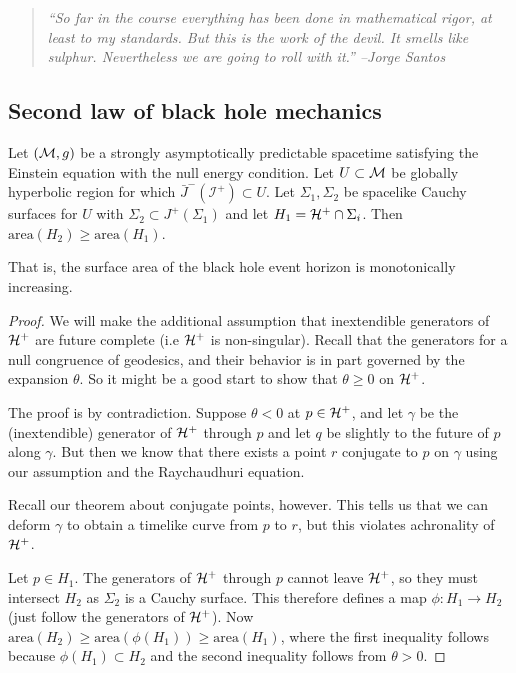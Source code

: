 \begin{quote}
    \textit{``So far in the course everything has been done in mathematical rigor, at least to my standards. But this is the work of the devil. It smells like sulphur. Nevertheless we are going to roll with it.'' --Jorge Santos}
\end{quote}
\subsection*{Second law of black hole mechanics}
\begin{thm}[Hawking 1972]
    Let $(\mathcal{M},g)$ be a strongly asymptotically predictable spacetime satisfying the Einstein equation with the null energy condition. Let $U\subset \mathcal{M}$ be globally hyperbolic region for which $\bar J^-(\mathcal{I}^+)\subset U$.  Let $\Sigma_1,\Sigma_2$ be spacelike Cauchy surfaces for $U$ with $\Sigma_2 \subset J^+(\Sigma_1)$ and let $H_1=\mathcal H^+ \cap \Sigma_i$. Then $\text{area}(H_2) \geq \text{area}(H_1)$.
\end{thm}
That is, the surface area of the black hole event horizon is monotonically increasing.
\begin{proof}
    We will make the additional assumption that inextendible generators of $\mathcal H^+$ are future complete (i.e $\mathcal H^+$ is non-singular). Recall that the generators for a null congruence of geodesics, and their behavior is in part governed by the expansion $\theta$. So it might be a good start to show that $\theta \geq 0$ on $\mathcal H^+$.
    
    The proof is by contradiction. Suppose $\theta < 0$ at $p\in \mathcal H^+$, and let $\gamma$ be the (inextendible) generator of $\mathcal H^+$ through $p$ and let $q$ be slightly to the future of $p$ along $\gamma$. But then we know that there exists a point $r$ conjugate to $p$ on $\gamma$ using our assumption and the Raychaudhuri equation.
    
    Recall our theorem about conjugate points, however. %
    This tells us that we can deform $\gamma$ to obtain a timelike curve from $p$ to $r$, but this violates achronality of $\mathcal H^+$.
    
    Let $p\in H_1$. The generators of $\mathcal H^+$ through $p$ cannot leave $\mathcal H^+$, so they must intersect $H_2$ as $\Sigma_2$ is a Cauchy surface. This therefore defines a map $\phi:H_1 \to H_2$ (just follow the generators of $\mathcal H^+$). Now $\text{area}(H_2) \geq \text{area}(\phi(H_1)) \geq \text{area}(H_1)$, where the first inequality follows because $\phi(H_1) \subset H_2$ and the second inequality follows from $\theta >0$.
\end{proof}

